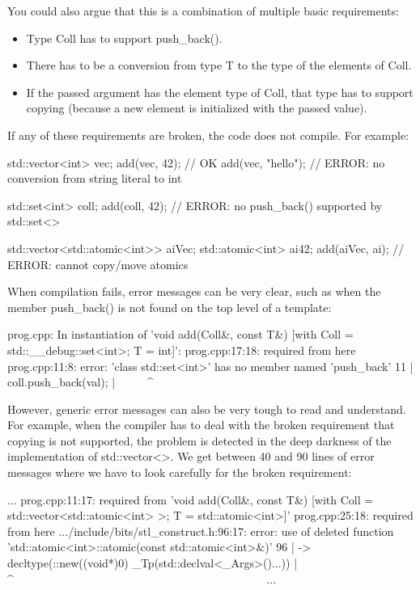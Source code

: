 You could also argue that this is a combination of multiple basic requirements:

\begin{itemize}
\item
Type Coll has to support push\_back().

\item
There has to be a conversion from type T to the type of the elements of Coll.

\item
If the passed argument has the element type of Coll, that type has to support copying (because a new element is initialized with the passed value).
\end{itemize}

If any of these requirements are broken, the code does not compile. For example:


\begin{cpp}
std::vector<int> vec;
add(vec, 42); // OK
add(vec, "hello"); // ERROR: no conversion from string literal to int

std::set<int> coll;
add(coll, 42); // ERROR: no push_back() supported by std::set<>

std::vector<std::atomic<int>> aiVec;
std::atomic<int> ai{42};
add(aiVec, ai); // ERROR: cannot copy/move atomics
\end{cpp}


When compilation fails, error messages can be very clear, such as when the member push\_back() is not found on the top level of a template:

{\footnotesize
\begin{shell}
prog.cpp: In instantiation of ’void add(Coll&, const T&)
             [with Coll = std::__debug::set<int>; T = int]’:
prog.cpp:17:18:     required from here
prog.cpp:11:8: error: ’class std::set<int>’ has no member named ’push_back’
  11 | coll.push_back(val);
      | ~~~~~^~~~~~~~~
\end{shell}
}

However, generic error messages can also be very tough to read and understand. For example, when the compiler has to deal with the broken requirement that copying is not supported, the problem is detected in the deep darkness of the implementation of std::vector<>. We get between 40 and 90 lines of error messages where we have to look carefully for the broken requirement:

{\footnotesize
\begin{shell}
...
prog.cpp:11:17: required from ’void add(Coll&, const T&)
                    [with Coll = std::vector<std::atomic<int> >; T = std::atomic<int>]’
prog.cpp:25:18:     required from here
.../include/bits/stl_construct.h:96:17:
    error: use of deleted function
’std::atomic<int>::atomic(const std::atomic<int>&)’
    96 | -> decltype(::new((void*)0) _Tp(std::declval<_Args>()...))
        |                  ^~~~~~~~~~~~~~~~~~~~~~~~~~~~~~~~~~~~~~~~~~~~~
...
\end{shell}
}


